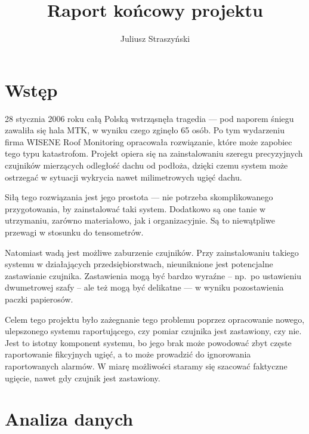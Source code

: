 \documentclass[12pt]{article}
\begin{document}
    \author{Juliusz Straszyński}
    \title{Raport końcowy projektu}
    \maketitle
    \tableofcontents


    \section{Wstęp}\label{sec:wstep}
    28 stycznia 2006 roku całą Polską wstrząsnęła tragedia — pod naporem śniegu zawaliła się hala MTK, w wyniku czego
    zginęło 65 osób.
    Po tym wydarzeniu firma WISENE Roof Monitoring opracowała rozwiązanie, które może zapobiec tego
    typu katastrofom.
    Projekt opiera się na zainstalowaniu szeregu precyzyjnych czujników mierzących odległość dachu
    od podłoża, dzięki czemu system może ostrzegać w sytuacji wykrycia nawet milimetrowych ugięć dachu.

    Siłą tego rozwiązania jest jego prostota — nie potrzeba skomplikowanego przygotowania, by zainstalować taki
    system.
    Dodatkowo są one tanie w utrzymaniu, zarówno materiałowo, jak i organizacyjnie.
    Są to niewątpliwe przewagi w stosunku do tensometrów.

    Natomiast wadą jest możliwe zaburzenie czujników.
    Przy zainstalowaniu takiego systemu w działających przedsiębiorstwach, nieuniknione jest potencjalne zastawianie
    czujnika.
    Zastawienia mogą być bardzo wyraźne -- np.\ po ustawieniu dwumetrowej szafy -- ale też mogą być
    delikatne — w wyniku pozostawienia paczki papierosów.

    Celem tego projektu było zażegnanie tego problemu poprzez opracowanie nowego, ulepszonego systemu raportującego,
    czy pomiar czujnika jest zastawiony, czy nie.
    Jest to istotny komponent systemu, bo jego brak może powodować zbyt
    częste raportowanie fikcyjnych ugięć, a to może prowadzić do ignorowania raportowanych alarmów.
    W miarę
    możliwości staramy się szacować faktyczne ugięcie, nawet gdy czujnik jest zastawiony.


    \section{Analiza danych}\label{sec:analiza-danych}
\end{document}
